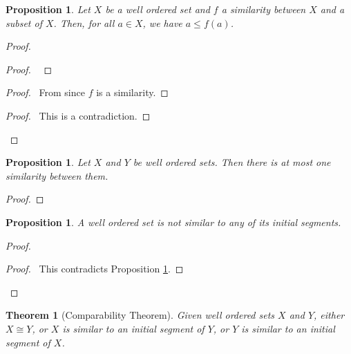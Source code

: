 \documentclass{report}
\let\qed\relax
\newtheorem{prop}[ax]{Proposition}
\newtheorem{thm}[ax]{Theorem}
\theoremstyle{definition}
\begin{document}
\begin{prop}
\label{prop:similar_subset}
Let $X$ be a well ordered set and $f$ a similarity between $X$ and a subset of $X$. Then, for all $a \in X$, we have $a \leq f(a)$.
\end{prop}

\begin{proof}
\pf
{}
\begin{proof}
	\pf\ 
\end{proof}
\begin{proof}
	\pf\ From  since $f$ is a similarity.
\end{proof}
\qedstep
\begin{proof}
	\pf\ This is a contradiction.
\end{proof}
\qed
\end{proof}

\begin{prop}
Let $X$ and $Y$ be well ordered sets. Then there is at most one similarity between them.
\end{prop}

\begin{proof}
\pf
{}
\qed
\end{proof}

\begin{prop}
A well ordered set is not similar to any of its initial segments.
\end{prop}

\begin{proof}
\pf
{}
\qedstep
\begin{proof}
	\pf\ This contradicts Proposition \ref{prop:similar_subset}.
\end{proof}
\qed
\end{proof}

\begin{thm}[Comparability Theorem]
Given well ordered sets $X$ and $Y$, either $X \cong Y$, or $X$ is similar to an initial segment of $Y$, or $Y$ is similar to an initial segment of $X$.
\end{thm}
\end{document}
